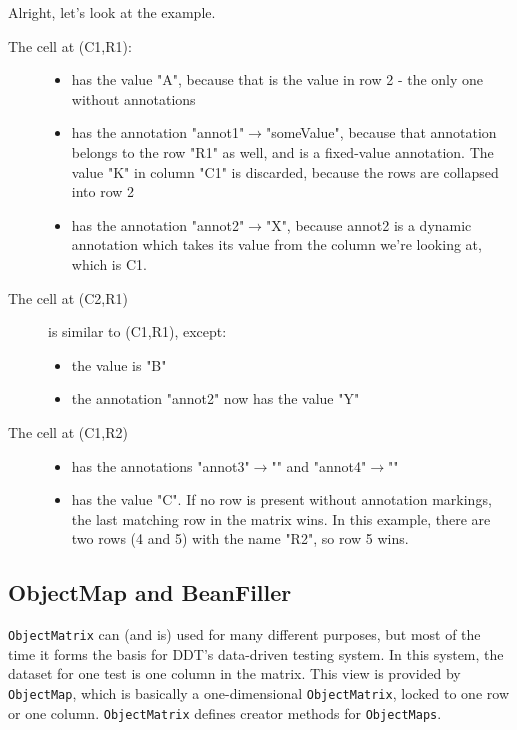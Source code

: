 Alright, let's look at the example.

\begin{description}
	\item[The cell at (C1,R1):] \hfill
	\begin{itemize}
		\item has the value "A", because that is the value in row 2 - the only one without annotations
		
		\item has the annotation "annot1"$\rightarrow $"someValue", because that annotation belongs to the row "R1" as well, and is a fixed-value annotation. The value "K" in column "C1" is discarded, because the rows are collapsed into row 2
		\item has the annotation "annot2"$\rightarrow $"X", because annot2 is a dynamic annotation which takes its value from the column we're looking at, which is C1.
	\end{itemize}
	
	\item[The cell at (C2,R1)] is similar to (C1,R1), except:
		\begin{itemize}
			\item the value is "B"
			\item the annotation "annot2" now has the value "Y"
		\end{itemize}
	
	\item[The cell at (C1,R2)] \hfill
		\begin{itemize}
			\item has the annotations "annot3"$\rightarrow $"" and "annot4"$\rightarrow $""
			\item has the value "C". If no row is present without annotation markings, the last matching row in the matrix wins. In this example, there are two rows (4 and 5) with the name "R2", so row 5 wins.
		\end{itemize}
\end{description}


\subsection{ObjectMap and BeanFiller} %
\label{sub:objectmap_and_beanfiller}

\texttt{ObjectMatrix} can (and is) used for many different purposes, but most of the time it forms the basis for \textsf{DDT}'s data-driven testing system. In this system, the dataset for one test is one column in the matrix. This view is provided by \texttt{ObjectMap}, which is basically a one-dimensional \texttt{ObjectMatrix}, locked to one row or one column. \texttt{ObjectMatrix} defines creator methods for \texttt{ObjectMaps}.

